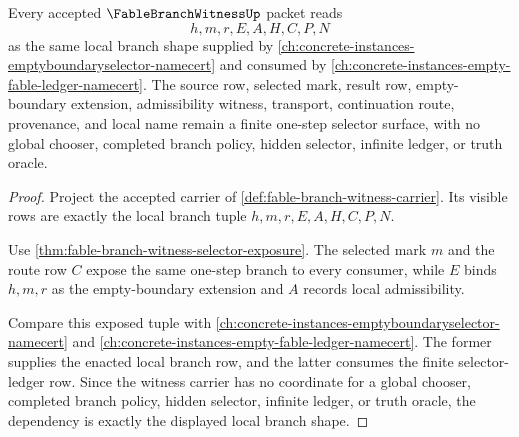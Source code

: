 \begin{theorem}
\label{thm:fable-branch-witness-empty-boundary-selector-dependency}
Every accepted $\FableBranchWitnessUp$ packet reads
$$
h,m,r,E,A,H,C,P,N
$$
as the same local branch shape supplied by \autoref{ch:concrete-instances-emptyboundaryselector-namecert} and consumed by \autoref{ch:concrete-instances-empty-fable-ledger-namecert}. The source row, selected mark, result row, empty-boundary extension, admissibility witness, transport, continuation route, provenance, and local name remain a finite one-step selector surface, with no global chooser, completed branch policy, hidden selector, infinite ledger, or truth oracle.
\end{theorem}
\begin{proof}
Project the accepted carrier of \autoref{def:fable-branch-witness-carrier}. Its visible rows are exactly the local branch tuple $h,m,r,E,A,H,C,P,N$.

Use \autoref{thm:fable-branch-witness-selector-exposure}. The selected mark $m$ and the route row $C$ expose the same one-step branch to every consumer, while $E$ binds $h,m,r$ as the empty-boundary extension and $A$ records local admissibility.

Compare this exposed tuple with \autoref{ch:concrete-instances-emptyboundaryselector-namecert} and \autoref{ch:concrete-instances-empty-fable-ledger-namecert}. The former supplies the enacted local branch row, and the latter consumes the finite selector-ledger row. Since the witness carrier has no coordinate for a global chooser, completed branch policy, hidden selector, infinite ledger, or truth oracle, the dependency is exactly the displayed local branch shape.
\end{proof}

